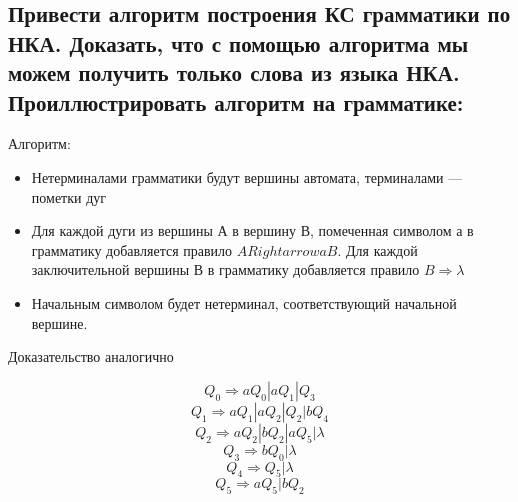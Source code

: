 \documentclass{article}
\begin{document}
\subsection{ Привести алгоритм построения КС грамматики по НКА. Доказать, что с помощью алгоритма мы можем получить только слова из языка НКА. Проиллюстрировать алгоритм на грамматике:}\newline
{Алгоритм: }\newline
\begin{itemize}
 \item {
    Нетерминалами  грамматики  будут  вершины  автомата, терминалами — пометки дуг
 }
 \item {
    Для  каждой дуги  из  вершины А в  вершину В,  помеченная  символом а в грамматику  добавляется правило $A Rightarrow aB$. Для каждой заключительной вершины В в грамматику добавляется правило $B \Rightarrow \lambda$
 }
 
 \item {
Начальным  символом  будет  нетерминал,  соответствующий начальной  вершине.
 }
 
\end{itemize}
 
{Доказательство аналогично}
 
$$ Q_0 \Rightarrow aQ_0 | aQ_1 | Q_3 $$
$$ Q_1 \Rightarrow aQ_1 | aQ_2 | Q_2 | bQ_4 $$
$$ Q_2 \Rightarrow aQ_2 | bQ_2 | aQ_5 | \lambda$$
$$ Q_3 \Rightarrow bQ_0 | \lambda$$
$$ Q_4 \Rightarrow Q_5 | \lambda$$
$$ Q_5 \Rightarrow aQ_5 | bQ_2$$
\end{document}

